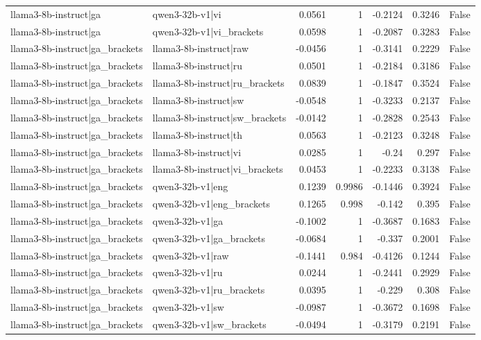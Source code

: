 \begin{table}
\begin{tabular}{l l r r r r l}
llama3-8b-instruct|ga & qwen3-32b-v1|vi & 0.0561 & 1 & -0.2124 & 0.3246 & False \\
llama3-8b-instruct|ga & qwen3-32b-v1|vi_brackets & 0.0598 & 1 & -0.2087 & 0.3283 & False \\
llama3-8b-instruct|ga_brackets & llama3-8b-instruct|raw & -0.0456 & 1 & -0.3141 & 0.2229 & False \\
llama3-8b-instruct|ga_brackets & llama3-8b-instruct|ru & 0.0501 & 1 & -0.2184 & 0.3186 & False \\
llama3-8b-instruct|ga_brackets & llama3-8b-instruct|ru_brackets & 0.0839 & 1 & -0.1847 & 0.3524 & False \\
llama3-8b-instruct|ga_brackets & llama3-8b-instruct|sw & -0.0548 & 1 & -0.3233 & 0.2137 & False \\
llama3-8b-instruct|ga_brackets & llama3-8b-instruct|sw_brackets & -0.0142 & 1 & -0.2828 & 0.2543 & False \\
llama3-8b-instruct|ga_brackets & llama3-8b-instruct|th & 0.0563 & 1 & -0.2123 & 0.3248 & False \\
llama3-8b-instruct|ga_brackets & llama3-8b-instruct|vi & 0.0285 & 1 & -0.24 & 0.297 & False \\
llama3-8b-instruct|ga_brackets & llama3-8b-instruct|vi_brackets & 0.0453 & 1 & -0.2233 & 0.3138 & False \\
llama3-8b-instruct|ga_brackets & qwen3-32b-v1|eng & 0.1239 & 0.9986 & -0.1446 & 0.3924 & False \\
llama3-8b-instruct|ga_brackets & qwen3-32b-v1|eng_brackets & 0.1265 & 0.998 & -0.142 & 0.395 & False \\
llama3-8b-instruct|ga_brackets & qwen3-32b-v1|ga & -0.1002 & 1 & -0.3687 & 0.1683 & False \\
llama3-8b-instruct|ga_brackets & qwen3-32b-v1|ga_brackets & -0.0684 & 1 & -0.337 & 0.2001 & False \\
llama3-8b-instruct|ga_brackets & qwen3-32b-v1|raw & -0.1441 & 0.984 & -0.4126 & 0.1244 & False \\
llama3-8b-instruct|ga_brackets & qwen3-32b-v1|ru & 0.0244 & 1 & -0.2441 & 0.2929 & False \\
llama3-8b-instruct|ga_brackets & qwen3-32b-v1|ru_brackets & 0.0395 & 1 & -0.229 & 0.308 & False \\
llama3-8b-instruct|ga_brackets & qwen3-32b-v1|sw & -0.0987 & 1 & -0.3672 & 0.1698 & False \\
llama3-8b-instruct|ga_brackets & qwen3-32b-v1|sw_brackets & -0.0494 & 1 & -0.3179 & 0.2191 & False \\

\end{tabular}
\end{table}
